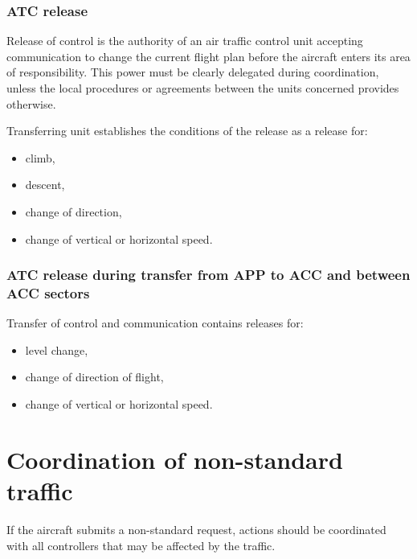 \subsubsection{ATC release}

Release of control is the authority of an air traffic control unit accepting
communication to change the current flight plan before the aircraft enters its
area of responsibility. This power must be clearly delegated during
coordination, unless the local procedures or agreements between the units
concerned provides otherwise.

Transferring unit establishes the conditions of the release as a release for:
\begin{itemize}
\item climb,
\item descent,
\item change of direction,
\item change of vertical or horizontal speed.
\end{itemize}

\subsubsection{ATC release during transfer from APP to ACC and between ACC
  sectors}

Transfer of control and communication contains releases for:

\begin{itemize}
\item level change,
\item change of direction of flight,
\item change of vertical or horizontal speed.
\end{itemize}

\section{Coordination of non-standard traffic}

If the aircraft submits a non-standard request, actions should be
coordinated with all controllers that may be affected by the traffic.

